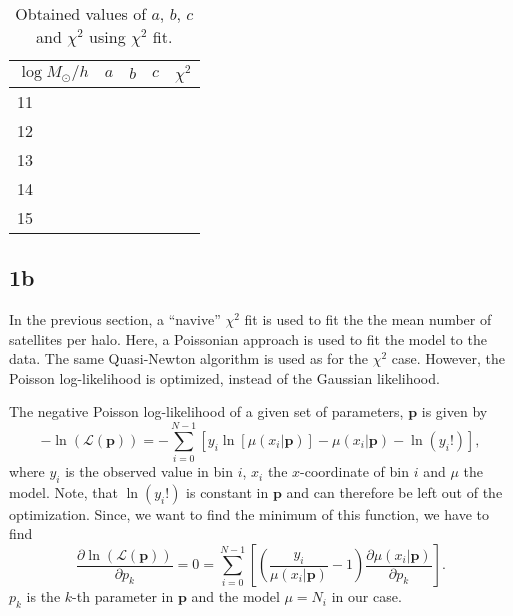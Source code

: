 \begin{table}[h]
    \caption{Obtained values of $a$, $b$, $c$ and $\chi^2$ using $\chi^2$ fit.}
    \label{tab:chi2}
    \centering
    \begin{tabular}{l|llll}
    $\log M_\odot/h$ & {$a$} & $b$ & $c$ & $\chi^2$                                              \\ \hline
    11          &  &  &  &  \\
    12          &  &  &  &  \\
    13          &  &  &  &  \\
    14          &  &  &  &  \\
    15          &  &  &  & 
    \end{tabular}
\end{table}

\subsection*{1b}
In the previous section, a ``navive'' $\chi^2$ fit is used to fit the the mean number of satellites per halo. Here, a Poissonian approach is used to fit the model to the data. The same Quasi-Newton algorithm is used as for the $\chi^2$ case. However, the Poisson log-likelihood is optimized, instead of the Gaussian likelihood. 

The negative Poisson log-likelihood of a given set of parameters, $\mathbf{p}$ is given by
\begin{equation}\label{eq:lnL}
    -\ln(\mathcal{L}(\mathbf{p})) = -\sum_{i=0}^{N-1}\left[y_i\ln[\mu(x_i|\mathbf{p})]-\mu(x_i|\mathbf{p}) - \ln(y_i!)\right],
\end{equation}
where $y_i$ is the observed value in bin $i$, $x_i$ the $x$-coordinate of bin $i$ and $\mu$ the model. Note, that $\ln(y_i!)$ is constant in $\mathbf{p}$ and can therefore be left out of the optimization. Since, we want to find the minimum of this function, we have to find
\begin{equation}\label{eq:grad_lnL}
    \frac{\partial \ln(\mathcal{L}(\mathbf{p}))}{\partial p_k} = 0 = \sum_{i=0}^{N-1}\left[ \left( \frac{y_i}{\mu(x_i|\mathbf{p})} -1 \right)  \frac{\partial \mu(x_i|\mathbf{p})}{\partial p_k} \right].
\end{equation}
$p_k$ is the $k$-th parameter in $\mathbf{p}$ and the model $\mu = N_i$ in our case.

